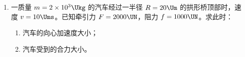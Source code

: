 \documentclass[\gkver]{gaokaozhenti}
\begin{document}
\begin{enumerate}
{解得 $Q = -W$

负号表示过程中气体放出热量 $W$。

（2）理想气体经历从 a 状态到 b 状态等温变化，由玻意耳定律有 $p_{0}V_{0} = pV$

解得 $p = \frac{V_{0}}{V}p_{0}$
}

\item
一质量 $m = 2\times10^{3}\Ukg$ 的汽车经过一半径 $R = 20\Um$ 的拱形桥顶部时，速度 $v = 10\Ums$。已知牵引力 $F = 2000\UN$，阻力 $f = 1000\UN$。求此时：
\begin{enumerate}
	\item
	汽车的向心加速度大小；
	\item
	汽车受到的合力大小。
\end{enumerate}


\end{enumerate}
\end{document}
